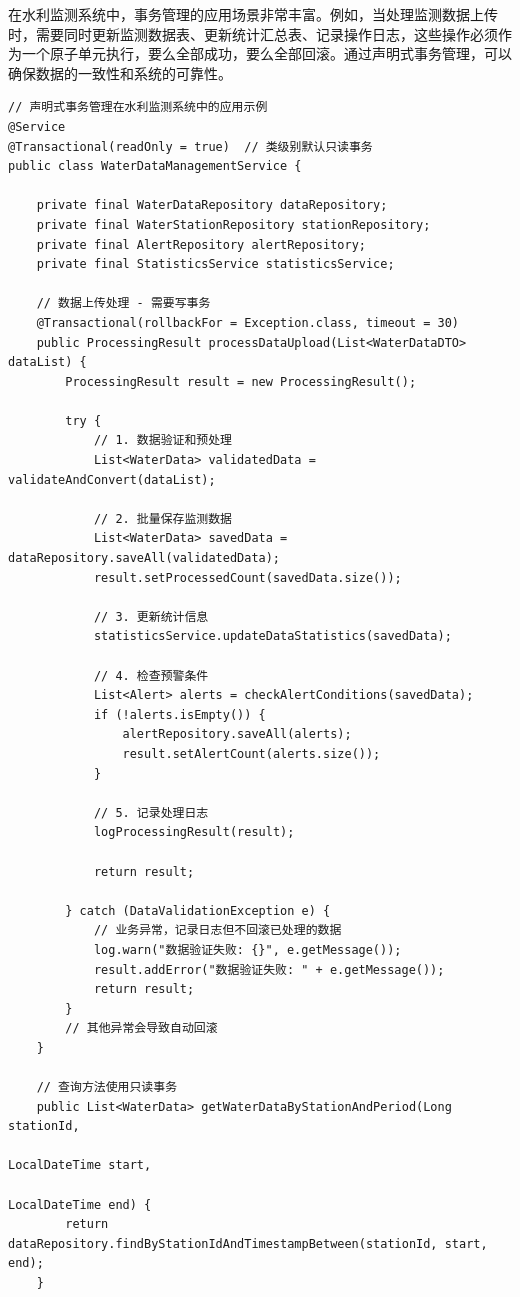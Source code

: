 在水利监测系统中，事务管理的应用场景非常丰富。例如，当处理监测数据上传时，需要同时更新监测数据表、更新统计汇总表、记录操作日志，这些操作必须作为一个原子单元执行，要么全部成功，要么全部回滚。通过声明式事务管理，可以确保数据的一致性和系统的可靠性。

\begin{lstlisting}[style=java]
// 声明式事务管理在水利监测系统中的应用示例
@Service
@Transactional(readOnly = true)  // 类级别默认只读事务
public class WaterDataManagementService {
    
    private final WaterDataRepository dataRepository;
    private final WaterStationRepository stationRepository;
    private final AlertRepository alertRepository;
    private final StatisticsService statisticsService;
    
    // 数据上传处理 - 需要写事务
    @Transactional(rollbackFor = Exception.class, timeout = 30)
    public ProcessingResult processDataUpload(List<WaterDataDTO> dataList) {
        ProcessingResult result = new ProcessingResult();
        
        try {
            // 1. 数据验证和预处理
            List<WaterData> validatedData = validateAndConvert(dataList);
            
            // 2. 批量保存监测数据
            List<WaterData> savedData = dataRepository.saveAll(validatedData);
            result.setProcessedCount(savedData.size());
            
            // 3. 更新统计信息
            statisticsService.updateDataStatistics(savedData);
            
            // 4. 检查预警条件
            List<Alert> alerts = checkAlertConditions(savedData);
            if (!alerts.isEmpty()) {
                alertRepository.saveAll(alerts);
                result.setAlertCount(alerts.size());
            }
            
            // 5. 记录处理日志
            logProcessingResult(result);
            
            return result;
            
        } catch (DataValidationException e) {
            // 业务异常，记录日志但不回滚已处理的数据
            log.warn("数据验证失败: {}", e.getMessage());
            result.addError("数据验证失败: " + e.getMessage());
            return result;
        }
        // 其他异常会导致自动回滚
    }
    
    // 查询方法使用只读事务
    public List<WaterData> getWaterDataByStationAndPeriod(Long stationId, 
                                                          LocalDateTime start, 
                                                          LocalDateTime end) {
        return dataRepository.findByStationIdAndTimestampBetween(stationId, start, end);
    }
    

\end{lstlisting}
